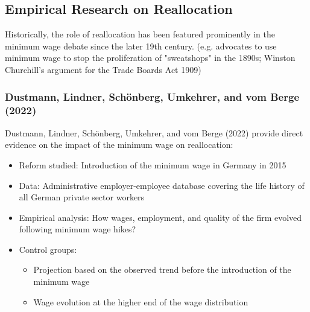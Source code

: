     \subsection{Empirical Research on Reallocation}
        Historically, the role of reallocation has been featured prominently in the minimum wage debate since the later 19th century. (e.g. advocates to use minimum wage to stop the proliferation of "sweatshops" in the 1890s; Winston Churchill's argument for the Trade Boards Act 1909)
        
        \subsubsection{Dustmann, Lindner, Schönberg, Umkehrer, and vom Berge (2022)}
            Dustmann, Lindner, Schönberg, Umkehrer, and vom Berge (2022) provide direct evidence on the impact of the minimum wage on reallocation:
            \begin{itemize}
                \item Reform studied: Introduction of the minimum wage in Germany in 2015
                \item Data: Administrative employer-employee database covering the life history of all German private sector workers
                \item Empirical analysis: How wages, employment, and quality of the firm evolved following minimum wage hikes?
                \item Control groups:
                    \begin{itemize}
                        \item Projection based on the observed trend before the introduction of the minimum wage
                        \item Wage evolution at the higher end of the wage distribution
                    \end{itemize}
            \end{itemize}
            
